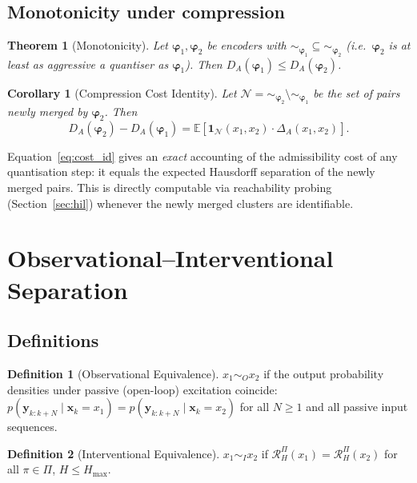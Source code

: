 \documentclass[10pt,twocolumn]{article}
\theoremstyle{plain}
\newtheorem{theorem}{Theorem}
\newtheorem{corollary}{Corollary}
\theoremstyle{definition}
\newtheorem{definition}{Definition}
\theoremstyle{remark}
\newcommand{\RHP}{\mathcal{R}_{H}^{\Pi}}
\newcommand{\bvphi}{\bm{\varphi}}
\newcommand{\E}{\mathbb{E}}
\begin{document}
\subsection{Monotonicity under compression}

\begin{theorem}[Monotonicity]
\label{thm:mono}
Let $\bvphi_1, \bvphi_2$ be encoders with
${\sim_{\bvphi_1}} \subseteq {\sim_{\bvphi_2}}$ (i.e.\ $\bvphi_2$ is
at least as aggressive a quantiser as $\bvphi_1$). Then
$D_A(\bvphi_1) \leq D_A(\bvphi_2)$.
\end{theorem}

\begin{corollary}[Compression Cost Identity]
Let $\mathcal{N} = {\sim_{\bvphi_2}}\setminus{\sim_{\bvphi_1}}$ be the
set of pairs newly merged by $\bvphi_2$. Then
\begin{equation}
  D_A(\bvphi_2) - D_A(\bvphi_1) = \E\!\left[
    \mathbf{1}_\mathcal{N}(x_1,x_2)\cdot\Delta_A(x_1,x_2)
  \right].
  \label{eq:cost_id}
\end{equation}
\end{corollary}

Equation~\eqref{eq:cost_id} gives an \emph{exact} accounting of the
admissibility cost of any quantisation step: it equals the expected Hausdorff
separation of the newly merged pairs. This is directly computable via
reachability probing (Section~\ref{sec:hil}) whenever the newly merged
clusters are identifiable.

\section{Observational--Interventional Separation}
\label{sec:oist}

\subsection{Definitions}

\begin{definition}[Observational Equivalence]
$x_1 \sim_O x_2$ if the output probability densities under passive (open-loop)
excitation coincide:
$p(\bm{y}_{k:k+N} \mid \bm{x}_k = x_1) = p(\bm{y}_{k:k+N} \mid \bm{x}_k = x_2)$
for all $N \geq 1$ and all passive input sequences.
\end{definition}

\begin{definition}[Interventional Equivalence]
$x_1 \sim_I x_2$ if $\RHP(x_1) = \RHP(x_2)$ for all $\pi \in \Pi$,
$H \leq H_{\max}$.
\end{definition}
\end{document}
